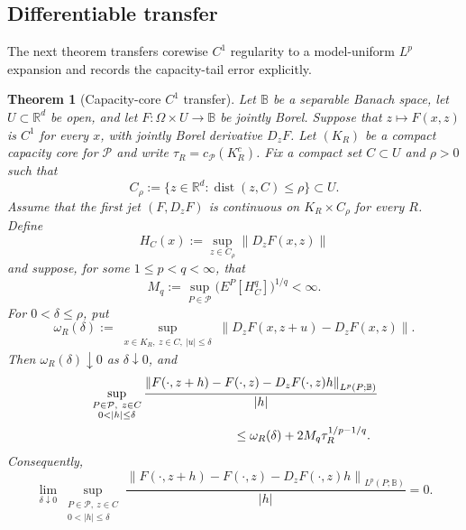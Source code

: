 \documentclass[11pt,reqno]{amsart}
\theoremstyle{plain}
\newtheorem{theorem}{Theorem}[section]
\theoremstyle{definition}
\newcommand{\R}{\mathbb R}
\newcommand{\cP}{\mathcal P}
\newcommand{\norm}[1]{\left\lVert #1\right\rVert}
\begin{document}
\subsection{Differentiable transfer}

The next theorem transfers corewise \(C^1\) regularity to a model-uniform
\(L^p\) expansion and records the capacity-tail error explicitly.

\begin{theorem}[Capacity-core \(C^1\) transfer]
\label{thm:core-C1-transfer}
Let \(\mathbb B\) be a separable Banach space, let \(U\subset\R^d\) be
open, and let \(F:\Omega\times U\to\mathbb B\) be jointly Borel.  Suppose
that \(z\mapsto F(x,z)\) is \(C^1\) for every \(x\), with jointly Borel
derivative \(D_zF\).  Let \((K_R)\) be a compact capacity core for \(\cP\)
and write \(\tau_R=c_{\cP}(K_R^c)\).  Fix a compact set \(C\subset U\) and
\(\rho>0\) such
that
\[
  C_\rho:=\{z\in\R^d:\operatorname{dist}(z,C)\le\rho\}
  \subset U.
\]
Assume that the first jet \((F,D_zF)\) is continuous on
\(K_R\times C_\rho\) for every \(R\).  Define
\[
  H_C(x):=\sup_{z\in C_\rho}\norm{D_zF(x,z)}
\]
and suppose, for some \(1\le p<q<\infty\), that
\begin{equation}\label{eq:C1-envelope}
  M_q:=\sup_{P\in\cP}
  \bigl(E^P[H_C^q]\bigr)^{1/q}<\infty.
\end{equation}
For \(0<\delta\le\rho\), put
\[
  \omega_R(\delta)
  :=\sup_{\substack{x\in K_R,\ z\in C,\ |u|\le\delta}}
  \norm{D_zF(x,z+u)-D_zF(x,z)}.
\]
Then \(\omega_R(\delta)\downarrow0\) as \(\delta\downarrow0\), and
\begin{align}
&\sup_{\substack{P\in\cP,\ z\in C\\0<|h|\le\delta}}
 \frac{\norm{F(\cdot,z+h)-F(\cdot,z)-D_zF(\cdot,z)h}_{L^p(P;\mathbb B)}}
 {|h|}
\notag\\
&\hspace{4cm}\le
  \omega_R(\delta)+2M_q\tau_R^{1/p-1/q}.
\label{eq:C1-transfer-bound}
\end{align}
Consequently,
\begin{equation}\label{eq:robust-Frechet}
  \lim_{\delta\downarrow0}
  \sup_{\substack{P\in\cP,\ z\in C\\0<|h|\le\delta}}
  \frac{\norm{F(\cdot,z+h)-F(\cdot,z)-D_zF(\cdot,z)h}_{L^p(P;\mathbb B)}}
  {|h|}=0.
\end{equation}


\end{theorem}
\end{document}
